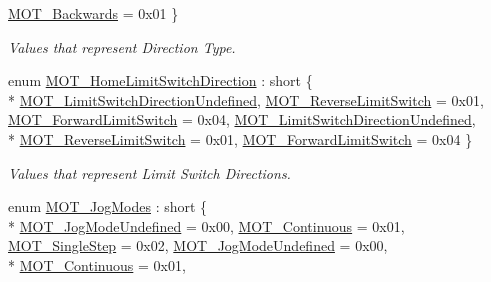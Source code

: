 \begin{DoxyCompactItemize}
\hyperlink{group___common_gga8e20138f47b000995f254ee6262f89d8a8e02e9b2bcad41ba25f2295821acd453}{M\+O\+T\+\_\+\+Backwards} = 0x01
 \}\begin{DoxyCompactList}\small\item\em Values that represent Direction Type. \end{DoxyCompactList}
\item 
enum \hyperlink{group___common_ga31437a532fa07483a38ddb3098eddc81}{M\+O\+T\+\_\+\+Home\+Limit\+Switch\+Direction} \+: short \{ \\*
\hyperlink{group___common_gga31437a532fa07483a38ddb3098eddc81a75c76c6aaef82a17fbcba35ea3fc6b14}{M\+O\+T\+\_\+\+Limit\+Switch\+Direction\+Undefined}, 
\hyperlink{group___common_gga31437a532fa07483a38ddb3098eddc81a05bc8e3317131f8bb0b98db97d4559fa}{M\+O\+T\+\_\+\+Reverse\+Limit\+Switch} = 0x01, 
\hyperlink{group___common_gga31437a532fa07483a38ddb3098eddc81a15484a33245b22a47a0b86e801317976}{M\+O\+T\+\_\+\+Forward\+Limit\+Switch} = 0x04, 
\hyperlink{group___common_gga31437a532fa07483a38ddb3098eddc81a75c76c6aaef82a17fbcba35ea3fc6b14}{M\+O\+T\+\_\+\+Limit\+Switch\+Direction\+Undefined}, 
\\*
\hyperlink{group___common_gga31437a532fa07483a38ddb3098eddc81a05bc8e3317131f8bb0b98db97d4559fa}{M\+O\+T\+\_\+\+Reverse\+Limit\+Switch} = 0x01, 
\hyperlink{group___common_gga31437a532fa07483a38ddb3098eddc81a15484a33245b22a47a0b86e801317976}{M\+O\+T\+\_\+\+Forward\+Limit\+Switch} = 0x04
 \}\begin{DoxyCompactList}\small\item\em Values that represent Limit Switch Directions. \end{DoxyCompactList}
\item 
enum \hyperlink{group___common_ga009eac484778f2873f249c8562d94a93}{M\+O\+T\+\_\+\+Jog\+Modes} \+: short \{ \\*
\hyperlink{group___common_gga009eac484778f2873f249c8562d94a93a617613975eacad76fbbebef812ecd63b}{M\+O\+T\+\_\+\+Jog\+Mode\+Undefined} = 0x00, 
\hyperlink{group___common_gga009eac484778f2873f249c8562d94a93ad2fb6219129282462f7f204c5af85b19}{M\+O\+T\+\_\+\+Continuous} = 0x01, 
\hyperlink{group___common_gga009eac484778f2873f249c8562d94a93a48cd563aa46a46ac784f7b13be3be86c}{M\+O\+T\+\_\+\+Single\+Step} = 0x02, 
\hyperlink{group___common_gga009eac484778f2873f249c8562d94a93a617613975eacad76fbbebef812ecd63b}{M\+O\+T\+\_\+\+Jog\+Mode\+Undefined} = 0x00, 
\\*
\hyperlink{group___common_gga009eac484778f2873f249c8562d94a93ad2fb6219129282462f7f204c5af85b19}{M\+O\+T\+\_\+\+Continuous} = 0x01, 

\end{DoxyCompactItemize}
